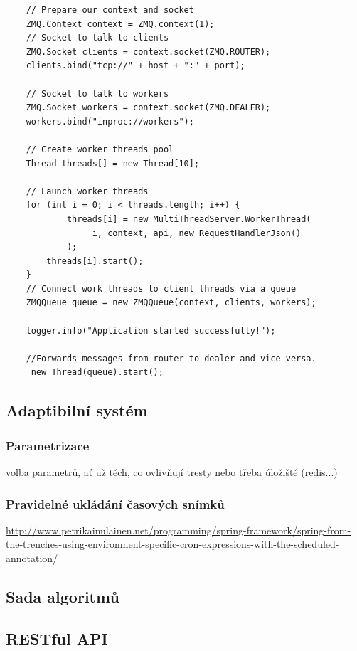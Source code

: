 \documentclass[thesis=M,czech]{FITthesis}[2014/05/07]
\begin{document}
\begin{verbatim}
    // Prepare our context and socket
    ZMQ.Context context = ZMQ.context(1);
    // Socket to talk to clients
    ZMQ.Socket clients = context.socket(ZMQ.ROUTER);
    clients.bind("tcp://" + host + ":" + port);

    // Socket to talk to workers
    ZMQ.Socket workers = context.socket(ZMQ.DEALER);
    workers.bind("inproc://workers");

    // Create worker threads pool
    Thread threads[] = new Thread[10];

    // Launch worker threads
    for (int i = 0; i < threads.length; i++) {
    		threads[i] = new MultiThreadServer.WorkerThread(
    		     i, context, api, new RequestHandlerJson()
    		);
        threads[i].start();
    }
    // Connect work threads to client threads via a queue
    ZMQQueue queue = new ZMQQueue(context, clients, workers);

    logger.info("Application started successfully!");

    //Forwards messages from router to dealer and vice versa.
     new Thread(queue).start();
\end{verbatim}

\subsection{Adaptibilní systém}
\subsubsection{Parametrizace}
volba parametrů, ať už těch, co ovlivňují tresty nebo třeba úložiště (redis...)

\subsubsection{Pravidelné ukládání časových snímků}
\url{http://www.petrikainulainen.net/programming/spring-framework/spring-from-the-trenches-using-environment-specific-cron-expressions-with-the-scheduled-annotation/}

\subsection{Sada algoritmů}
\label{sec:alg}

\subsection{RESTful API}
\end{document}
